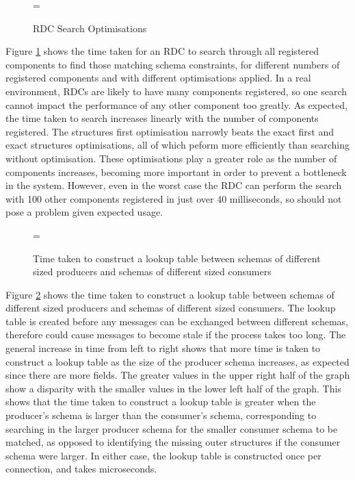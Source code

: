 \documentclass[12pt,twoside,notitlepage]{report}
\begin{document}
\begin{figure}[tbh]
\epsfxsize=\hsize
\centerline{}
\caption{RDC Search Optimisations}
\label{fig:rdc_search_optimisations}
\end{figure}

Figure \ref{fig:rdc_search_optimisations} shows the time taken for an RDC to search through all registered components to find those matching schema constraints, for different numbers of registered components and with different optimisations applied. 
In a real environment, RDCs are likely to have many components registered, so one search cannot impact the performance of any other component too greatly.
As expected, the time taken to search increases linearly with the number of components registered. 
The structures first optimisation narrowly beats the exact first and exact structures optimisations, all of which peform more efficiently than searching without optimisation. 
These optimisations play a greater role as the number of components increases, becoming more important in order to prevent a bottleneck in the system. 
However, even in the worst case the RDC can perform the search with 100 other components registered in just over 40 milliseconds, so should not pose a problem given expected usage.

\begin{figure}[tbh]
\epsfxsize=\hsize
\centerline{}
\caption[Construct Lookup Times]{Time taken to construct a lookup table between schemas of different sized producers and schemas of different sized consumers}
\label{fig:construct_lookup}
\end{figure}

Figure \ref{fig:construct_lookup} shows the time taken to construct a lookup table between schemas of different sized producers and schemas of different sized consumers. 
The lookup table is created before any messages can be exchanged between different schemas, therefore could cause messages to become stale if the process takes too long.
The general increase in time from left to right shows that more time is taken to construct a lookup table as the size of the producer schema increases, as expected since there are more fields. 
The greater values in the upper right half of the graph show a disparity with the smaller values in the lower left half of the graph. 
This shows that the time taken to construct a lookup table is greater when the producer's schema is larger than the consumer's schema, corresponding to searching in the larger producer schema for the smaller consumer schema to be matched, as opposed to identifying the missing outer structures if the consumer schema were larger.
In either case, the lookup table is constructed once per connection, and takes microseconds.
\end{document}

